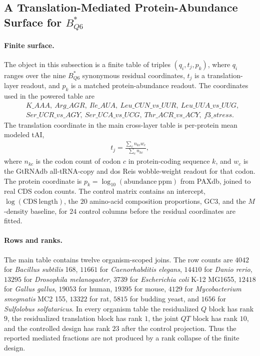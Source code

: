\subsection{A Translation-Mediated Protein-Abundance Surface for $B^{*}_{Q6}$}
\label{sec:q6-translation-mediated-protein-abundance-cross-layer}

\paragraph{Finite surface.}
The object in this subsection is a finite table of triples $(q_i,t_j,p_k)$, where $q_i$ ranges over the nine $B^{*}_{Q6}$ synonymous residual coordinates, $t_j$ is a translation-layer readout, and $p_k$ is a matched protein-abundance readout. The coordinates used in the powered table are
$$\begin{aligned}
&K\_AAA,\ Arg\_AGR,\ Ile\_AUA,\ Leu\_CUN\_vs\_UUR,\ Leu\_UUA\_vs\_UUG,\\
&Ser\_UCR\_vs\_AGY,\ Ser\_UCA\_vs\_UCG,\ Thr\_ACR\_vs\_ACY,\ f3\_stress.
\end{aligned}$$
The translation coordinate in the main cross-layer table is per-protein mean modeled tAI,
$$\begin{aligned}
t_j=\frac{\sum_c n_{kc}w_c}{\sum_c n_{kc}},
\end{aligned}$$
where $n_{kc}$ is the codon count of codon $c$ in protein-coding sequence $k$, and $w_c$ is the GtRNAdb all-tRNA-copy and dos Reis wobble-weight readout for that codon. The protein coordinate is $p_k=\log_{10}(\mathrm{abundance\ ppm})$ from PAXdb, joined to real CDS codon counts. The control matrix contains an intercept, $\log(\mathrm{CDS\ length})$, the $20$ amino-acid composition proportions, GC3, and the $M$-density baseline, for $24$ control columns before the residual coordinates are fitted.

\paragraph{Rows and ranks.}
The main table contains twelve organism-scoped joins. The row counts are $4042$ for \emph{Bacillus subtilis} 168, $11661$ for \emph{Caenorhabditis elegans}, $14410$ for \emph{Danio rerio}, $13295$ for \emph{Drosophila melanogaster}, $3739$ for \emph{Escherichia coli} K-12 MG1655, $12418$ for \emph{Gallus gallus}, $19053$ for human, $19395$ for mouse, $4129$ for \emph{Mycobacterium smegmatis} MC2 155, $13322$ for rat, $5815$ for budding yeast, and $1656$ for \emph{Sulfolobus solfataricus}. In every organism table the residualized $Q$ block has rank $9$, the residualized translation block has rank $1$, the joint $QT$ block has rank $10$, and the controlled design has rank $23$ after the control projection. Thus the reported mediated fractions are not produced by a rank collapse of the finite design.

